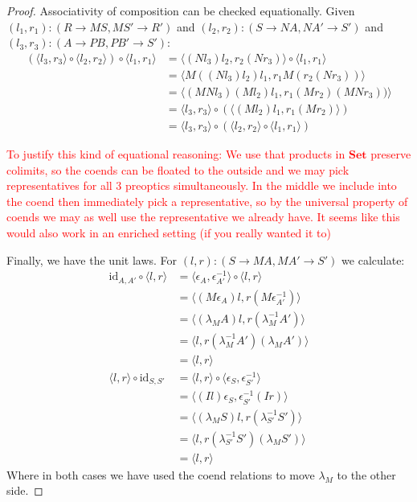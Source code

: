 \documentclass[11pt,a4paper]{article}
\theoremstyle{plain}
\theoremstyle{definition}
\newcommand{\Set}{\mathbf{Set}}
\newcommand{\id}{\mathrm{id}}
\newcommand{\todo}[1]{\textcolor{red}{\small #1}}
\begin{document}
\begin{proof}
Associativity of composition can be checked equationally. Given $(l_1, r_1) : (R \to MS, MS' \to R')$ and $(l_2, r_2) : (S \to NA, NA' \to S')$ and $(l_3, r_3) : (A \to PB, PB' \to S')$:
\begin{align*}
(\langle l_3, r_3 \rangle \circ \langle l_2, r_2 \rangle) \circ \langle l_1, r_1 \rangle 
&= \langle (N l_3)l_2, r_2(Nr_3) \rangle \circ \langle l_1, r_1 \rangle \\
&= \langle M((N l_3)l_2)l_1, r_1M(r_2(Nr_3)) \rangle \\
&= \langle (M N l_3)(M l_2)l_1, r_1(M r_2)(MNr_3)) \rangle \\
&= \langle l_3, r_3 \rangle \circ (\langle (M l_2)l_1, r_1(Mr_2) \rangle) \\
&= \langle l_3, r_3 \rangle \circ (\langle l_2, r_2 \rangle \circ \langle l_1, r_1 \rangle)
\end{align*}

\todo{To justify this kind of equational reasoning: We use that products in $\Set$ preserve colimits, so the coends can be floated to the outside and we may pick representatives for all 3 preoptics simultaneously. In the middle we include into the coend then immediately pick a representative, so by the universal property of coends we may as well use the representative we already have. It seems like this would also work in an enriched setting (if you really wanted it to)}

Finally, we have the unit laws. For $(l, r) : (S \to MA, MA' \to S')$ we calculate:
\begin{align*}
\id_{A, A'} \circ \langle l, r\rangle 
&= \langle \epsilon_A, \epsilon_{A'}^{-1} \rangle \circ \langle l, r\rangle \\
&= \langle (M\epsilon_A) l, r (M\epsilon_{A'}^{-1})\rangle \\
&= \langle (\lambda_M A) l, r (\lambda_M^{-1} A')\rangle \\
&= \langle l, r (\lambda_M^{-1} A') (\lambda_M A')\rangle \\
&= \langle l, r \rangle  \\
\langle l, r \rangle \circ \id_{S, S'} 
&= \langle l, r \rangle \circ \langle \epsilon_S, \epsilon_{S'}^{-1} \rangle  \\
&= \langle (Il)\epsilon_S, \epsilon_{S'}^{-1} (Ir) \rangle \\
&= \langle (\lambda_M S)l, r (\lambda_{S'}^{-1} S') \rangle \\
&= \langle l, r (\lambda_{S'}^{-1} S')(\lambda_M S') \rangle \\
&= \langle l, r \rangle
\end{align*}
Where in both cases we have used the coend relations to move $\lambda_M$ to the other side.
\end{proof}
\end{document}
